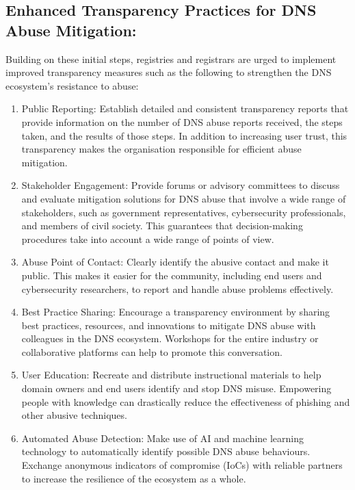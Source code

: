 \subsection{Enhanced Transparency Practices for DNS Abuse Mitigation: }

Building on these initial steps, registries and registrars are urged to implement improved transparency measures such as the following to strengthen the DNS ecosystem's resistance to abuse:

\begin{enumerate}
    \item Public Reporting: Establish detailed and consistent transparency reports that provide information on the number of DNS abuse reports received, the steps taken, and the results of those steps. In addition to increasing user trust, this transparency makes the organisation responsible for efficient abuse mitigation.

    \item Stakeholder Engagement: Provide forums or advisory committees to discuss and evaluate mitigation solutions for DNS abuse that involve a wide range of stakeholders, such as government representatives, cybersecurity professionals, and members of civil society. This guarantees that decision-making procedures take into account a wide range of points of view.

    \item Abuse Point of Contact: Clearly identify the abusive contact and make it public. This makes it easier for the community, including end users and cybersecurity researchers, to report and handle abuse problems effectively.

    \item Best Practice Sharing: Encourage a transparency environment by sharing best practices, resources, and innovations to mitigate DNS abuse with colleagues in the DNS ecosystem. Workshops for the entire industry or collaborative platforms can help to promote this conversation.

    \item User Education: Recreate and distribute instructional materials to help domain owners and end users identify and stop DNS misuse. Empowering people with knowledge can drastically reduce the effectiveness of phishing and other abusive techniques.

    \item Automated Abuse Detection: Make use of AI and machine learning technology to automatically identify possible DNS abuse behaviours. Exchange anonymous indicators of compromise (IoCs) with reliable partners to increase the resilience of the ecosystem as a whole.

\end{enumerate}


